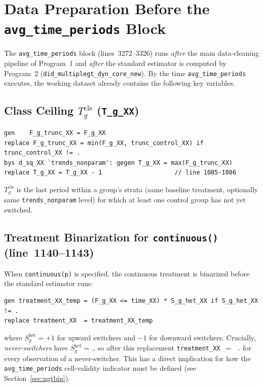 \documentclass[11pt]{article}
\begin{document}
\section{Data Preparation Before the \texttt{avg\_time\_periods} Block}

The \texttt{avg\_time\_periods} block (lines~3272--3326) runs \emph{after} the
main data-cleaning pipeline of Program~1 and \emph{after} the standard
estimator is computed by Program~2 (\texttt{did\_multiplegt\_dyn\_core\_new}).
By the time \texttt{avg\_time\_periods} executes, the working dataset already
contains the following key variables.

\subsection{Class Ceiling \texorpdfstring{$T_g^{\text{cls}}$}{Tg cls}
            (\texttt{T\_g\_XX})}

\begin{lstlisting}[language={}]
gen    F_g_trunc_XX = F_g_XX
replace F_g_trunc_XX = min(F_g_XX, trunc_control_XX) if trunc_control_XX != .
bys d_sq_XX `trends_nonparam': gegen T_g_XX = max(F_g_trunc_XX)
replace T_g_XX = T_g_XX - 1                    // line 1085-1086
\end{lstlisting}

$T_g^{\text{cls}}$ is the last period within a group's strata (same baseline
treatment, optionally same \texttt{trends\_nonparam} level) for which at least
one control group has not yet switched.

\subsection{Treatment Binarization for \texttt{continuous()} (line~1140--1143)}

When \texttt{continuous(p)} is specified, the continuous treatment is
binarized before the standard estimator runs:

\begin{lstlisting}[language={}]
gen treatment_XX_temp = (F_g_XX <= time_XX) * S_g_het_XX if S_g_het_XX != .
replace treatment_XX  = treatment_XX_temp
\end{lstlisting}

where $S_g^{\text{het}} = +1$ for upward switchers and $-1$ for downward
switchers. Crucially, \emph{never-switchers} have $S_g^{\text{het}} = \texttt{.}$,
so after this replacement \texttt{treatment\_XX $= $ .} for every observation
of a never-switcher. This has a direct implication for how the
\texttt{avg\_time\_periods} cell-validity indicator must be defined
(see Section~\ref{sec:ngtbin}).
\end{document}
